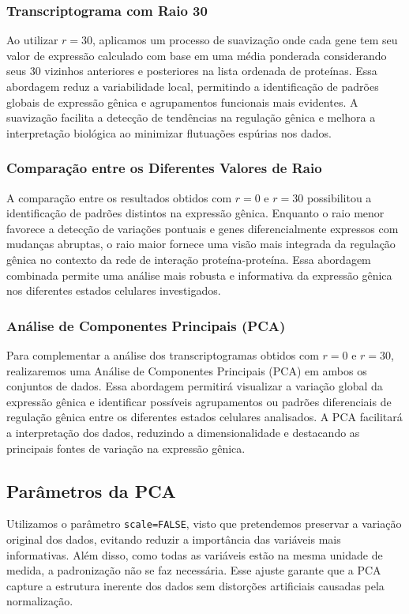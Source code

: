 \documentclass[12pt]{article}
\begin{document}
\subsubsection{Transcriptograma com Raio 30}
Ao utilizar $r = 30$, aplicamos um processo de suavização onde cada gene tem seu valor de expressão calculado com base em uma média ponderada considerando seus 30 vizinhos anteriores e posteriores na lista ordenada de proteínas. Essa abordagem reduz a variabilidade local, permitindo a identificação de padrões globais de expressão gênica e agrupamentos funcionais mais evidentes. A suavização facilita a detecção de tendências na regulação gênica e melhora a interpretação biológica ao minimizar flutuações espúrias nos dados.

\subsubsection{Comparação entre os Diferentes Valores de Raio}
A comparação entre os resultados obtidos com $r = 0$ e $r = 30$ possibilitou a identificação de padrões distintos na expressão gênica. Enquanto o raio menor favorece a detecção de variações pontuais e genes diferencialmente expressos com mudanças abruptas, o raio maior fornece uma visão mais integrada da regulação gênica no contexto da rede de interação proteína-proteína. Essa abordagem combinada permite uma análise mais robusta e informativa da expressão gênica nos diferentes estados celulares investigados.

\subsubsection{Análise de Componentes Principais (PCA)}
Para complementar a análise dos transcriptogramas obtidos com $r = 0$ e $r = 30$, realizaremos uma Análise de Componentes Principais (PCA) em ambos os conjuntos de dados. Essa abordagem permitirá visualizar a variação global da expressão gênica e identificar possíveis agrupamentos ou padrões diferenciais de regulação gênica entre os diferentes estados celulares analisados. A PCA facilitará a interpretação dos dados, reduzindo a dimensionalidade e destacando as principais fontes de variação na expressão gênica.

\subsection{Parâmetros da PCA}
Utilizamos o parâmetro \texttt{scale=FALSE}, visto que pretendemos preservar a variação original dos dados, evitando reduzir a importância das variáveis mais informativas. Além disso, como todas as variáveis estão na mesma unidade de medida, a padronização não se faz necessária. Esse ajuste garante que a PCA capture a estrutura inerente dos dados sem distorções artificiais causadas pela normalização.
\end{document}
